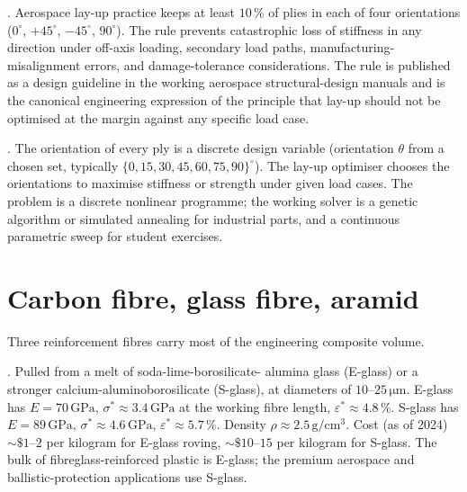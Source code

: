 . Aerospace lay-up practice keeps at
least $10\,\%$ of plies in each of four orientations ($0^\circ$,
$+45^\circ$, $-45^\circ$, $90^\circ$). The rule prevents catastrophic
loss of stiffness in any direction under off-axis loading, secondary
load paths, manufacturing-misalignment errors, and damage-tolerance
considerations. The rule is published as a design guideline in the
working aerospace structural-design manuals and is the canonical
engineering expression of the principle that lay-up should not be
optimised at the margin against any specific load case.

. The orientation of every ply is a
discrete design variable (orientation $\theta$ from a chosen set,
typically $\{0, 15, 30, 45, 60, 75, 90\}^\circ$). The lay-up optimiser
chooses the orientations to maximise stiffness or strength under given
load cases. The problem is a discrete nonlinear programme; the working
solver is a genetic algorithm or simulated annealing for industrial
parts, and a continuous parametric sweep for student exercises.

\section{Carbon fibre, glass fibre, aramid}

Three reinforcement fibres carry most of the engineering composite
volume.

. Pulled from a melt of soda-lime-borosilicate-
alumina glass (E-glass) or a stronger calcium-aluminoborosilicate
(S-glass), at diameters of $10$--$25\,\si{\micro\meter}$. E-glass has
$E = 70\,\text{GPa}$, $\sigma^* \approx 3.4\,\text{GPa}$ at the
working fibre length, $\varepsilon^* \approx 4.8\,\%$. S-glass has
$E = 89\,\text{GPa}$, $\sigma^* \approx 4.6\,\text{GPa}$,
$\varepsilon^* \approx 5.7\,\%$. Density $\rho \approx 2.5\,
\text{g}/\text{cm}^3$. Cost (as of 2024) $\sim \$1$--$2$ per
kilogram for E-glass roving, $\sim \$10$--$15$ per kilogram for
S-glass. The bulk of fibreglass-reinforced plastic is E-glass; the
premium aerospace and ballistic-protection applications use S-glass.

